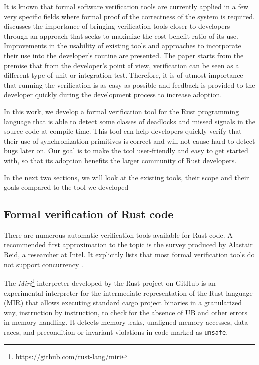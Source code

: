 \documentclass[../Thesis.tex]{subfiles}
\begin{document}
It is known that formal software verification tools are currently applied
in a few very specific fields where
formal proof of the correctness of the system is required.
\cite{reid:hatra:2020} discusses the importance of bringing verification
tools closer to developers through an approach
that seeks to maximize the cost-benefit ratio of its use.
Improvements in the usability of existing tools and
approaches to incorporate their use into the developer's routine are presented.
The paper starts from the premise that from the developer's point of view,
verification can be seen as a different type of unit or integration test.
Therefore, it is of utmost importance that running the verification is as easy as possible
and feedback is provided to the developer quickly during the development process
to increase adoption.

In this work, we develop a formal verification tool
for the Rust programming language that is able to detect some classes of deadlocks
and missed signals in the source code at compile time.
This tool can help developers quickly verify
that their use of synchronization primitives
is correct and will not cause hard-to-detect bugs later on.
Our goal is to make the tool user-friendly and easy to get started with,
so that its adoption benefits the larger community of Rust developers.

In the next two sections, we will look at the existing tools,
their scope and their goals compared to the tool we developed.

\subsection{Formal verification of Rust code}

There are numerous automatic verification tools available for Rust code.
A recommended first approximation to the topic is
the survey produced by Alastair Reid, a researcher at Intel.
It explicitly lists that most formal verification tools
do not support concurrency \cite{reid2021}.

The \emph{Miri}\footnote{\url{https://github.com/rust-lang/miri}} interpreter
developed by the Rust project on GitHub is an experimental interpreter
for the intermediate representation of the Rust language (\acrfull{MIR})
that allows executing standard cargo project binaries
in a granularized way, instruction by instruction,
to check for the absence of \acrfull{UB}
and other errors in memory handling.
It detects memory leaks, unaligned memory accesses, data races,
and precondition or invariant violations in code marked as \texttt{unsafe}.
\end{document}
